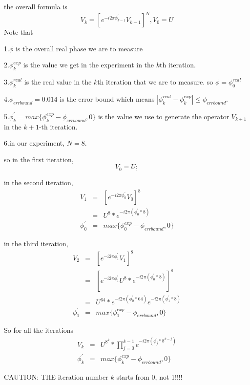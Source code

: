 \documentclass[twocolumn,twoside,10pt,superscriptaddress,prl]{revtex4}
\begin{document}
the overall formula is
$$
V_k = [e^{-i2\pi\phi^{'}_{k-1}}V_{k-1}]^N,V_0=U
$$
Note that

1.$\phi$ is the overall real phase we are to measure

2.$\phi^{exp}_k$ is the value we get in the experiment in the $k$th
 iteration.

3.$\phi^{real}_k$ is the real value in the $k$th iteration that we
are to measure. so $\phi=\phi^{real}_0$

4.$\phi_{errbound}=0.014$ is the error bound which means
$|\phi^{real}_k-\phi^{exp}_k|\leq \phi_{errbound}$.

5.$\phi^{'}_k=max\{\phi^{exp}_k-\phi_{errbound},0\}$ is the value we
use to generate the operator $V_{k+1}$ in the  $k+1$-th iteration.

6.in our experiment, $N=8$.

so in the first iteration,
$$
V_0 = U;
$$

in the second iteration,
\begin{eqnarray}
V_1&=&[e^{-i2\pi\phi^{'}_0}V_0]^8\\
&=&U^8*e^{-i2\pi(\phi^{'}_0*8)}\\
\phi^{'}_0&=&max\{\phi^{exp}_0-\phi_{errbound},0\}
\end{eqnarray}

in the third iteration,
\begin{eqnarray}
V_2&=&[e^{-i2\pi\phi^{'}_1}V_1]^8\\
&=&[e^{-i2\pi\phi^{'}_1}U^8*e^{-i2\pi(\phi^{'}_0*8)}]^8\\
&=&U^{64}*e^{-i2\pi(\phi^{'}_0*64)}e^{-i2\pi(\phi^{'}_1*8)}\\
\phi^{'}_1&=&max\{\phi^{exp}_1-\phi_{errbound},0\}
\end{eqnarray}

So for all the iterations
\begin{eqnarray}
V_k&=&U^{8^k}*\prod^{k-1}_{j=0}{e^{-i2\pi(\phi^{'}_j*8^{k-j})}}\\
\phi^{'}_k&=&max\{\phi^{exp}_k-\phi_{errbound},0\}
\end{eqnarray}

CAUTION: THE iteration number $k$ starts from 0, not 1!!!!
\end{document}
